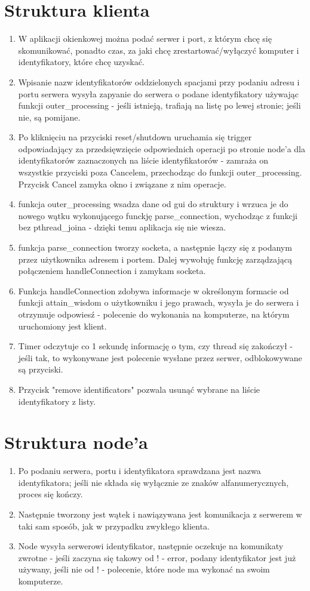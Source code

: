 \documentclass[12pt]{article}
\begin{document}
\section{Struktura klienta}
\begin{enumerate}
	\item W aplikacji okienkowej można podać serwer i port, z którym chcę się skomunikować, ponadto czas, za jaki chcę zrestartować/wyłączyć komputer i identyfikatory, które chcę uzyskać.
	\item Wpisanie nazw identyfikatorów oddzielonych spacjami przy podaniu adresu i portu serwera wysyła zapyanie do serwera o podane identyfikatory używając funkcji outer\_processing  - jeśli istnieją, trafiają na listę po lewej stronie; jeśli nie, są pomijane.
	\item Po kliknięciu na przyciski reset/shutdown uruchamia się trigger odpowiadający za przedsięwzięcie odpowiednich operacji po stronie node'a dla identyfikatorów zaznaczonych na liście identyfikatorów - zamraża on wszystkie przyciski poza Cancelem, przechodząc do funkcji outer\_processing. Przycisk Cancel zamyka okno i związane z nim operacje.
	\item funkcja outer\_processing wsadza dane od gui do struktury i wrzuca je do nowego wątku wykonującego funckję parse\_connection, wychodząc z funkcji bez pthread\_joina - dzięki temu aplikacja się nie wiesza.
	\item funkcja parse\_connection tworzy socketa, a następnie łączy się z podanym przez użytkownika adresem i portem. Dalej wywołuję funkcję zarządzającą połączeniem handleConnection i zamykam socketa.
	\item Funkcja handleConnection zdobywa informacje w określonym formacie od funkcji attain\_wisdom o użytkowniku i jego prawach, wysyła je do serwera i otrzymuje odpowiesź - polecenie do wykonania na komputerze, na którym uruchomiony jest klient.
	\item Timer odczytuje co 1 sekundę informację o tym, czy thread się zakończył - jeśli tak, to wykonywane jest polecenie wysłane przez serwer, odblokowywane są przyciski.
	\item Przycisk "remove identificators" pozwala usunąć wybrane na liście identyfikatory z listy. 
\end{enumerate}

\section{Struktura node'a}
\begin{enumerate}
	\item Po podaniu serwera, portu i identyfikatora sprawdzana jest nazwa identyfikatora; jeśli nie składa się wyłącznie ze znaków alfanumerycznych, proces się kończy.
	\item Następnie tworzony jest wątek i nawiązywana jest komunikacja z serwerem w taki sam sposób, jak w przypadku zwykłego klienta.
	\item Node wysyła serwerowi identyfikator, następnie oczekuje na komunikaty zwrotne - jeśli zaczyna się takowy od ! - error, podany identyfikator jest już używany, jeśli nie od ! - polecenie, które node ma wykonać na swoim komputerze.
\end{enumerate}
\end{document}
